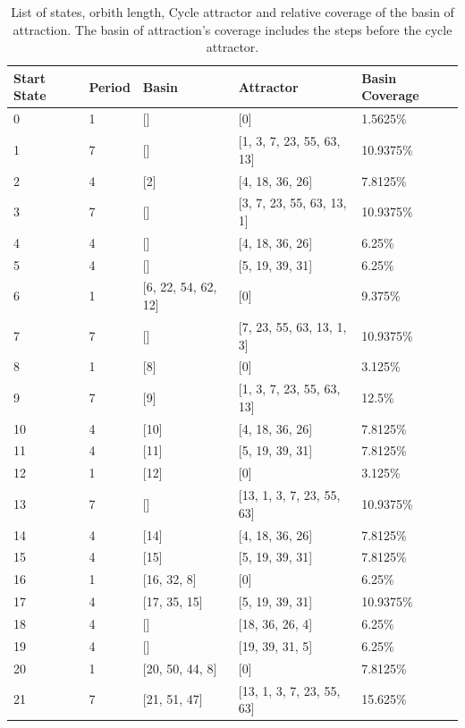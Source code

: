 \documentclass[10pt,a4paper]{article}
\begin{document}
\begin{enumerate}
\begin{table}[H]
	\centering
	\caption{List of states, orbith length, Cycle attractor and relative coverage of the basin of attraction. The basin of attraction's coverage includes the steps before the cycle attractor.}
	\label{tabelsomething}
	\begin{tabular}{|l|l|l|l|l|}
		\hline
		\textbf{Start State} & \textbf{Period} & \textbf{Basin} & \textbf{Attractor} & \textbf{Basin Coverage} \\ \hline 
		0 & 1 & [] & [0] & 1.5625\%\\ \hline 
		1 & 7 & [] & [1, 3, 7, 23, 55, 63, 13] & 10.9375\%\\ \hline 
		2 & 4 & [2] & [4, 18, 36, 26] & 7.8125\%\\ \hline 
		3 & 7 & [] & [3, 7, 23, 55, 63, 13, 1] & 10.9375\%\\ \hline 
		4 & 4 & [] & [4, 18, 36, 26] & 6.25\%\\ \hline 
		5 & 4 & [] & [5, 19, 39, 31] & 6.25\%\\ \hline 
		6 & 1 & [6, 22, 54, 62, 12] & [0] & 9.375\%\\ \hline 
		7 & 7 & [] & [7, 23, 55, 63, 13, 1, 3] & 10.9375\%\\ \hline 
		8 & 1 & [8] & [0] & 3.125\%\\ \hline 
		9 & 7 & [9] & [1, 3, 7, 23, 55, 63, 13] & 12.5\%\\ \hline 
		10 & 4 & [10] & [4, 18, 36, 26] & 7.8125\%\\ \hline 
		11 & 4 & [11] & [5, 19, 39, 31] & 7.8125\%\\ \hline 
		12 & 1 & [12] & [0] & 3.125\%\\ \hline 
		13 & 7 & [] & [13, 1, 3, 7, 23, 55, 63] & 10.9375\%\\ \hline 
		14 & 4 & [14] & [4, 18, 36, 26] & 7.8125\%\\ \hline 
		15 & 4 & [15] & [5, 19, 39, 31] & 7.8125\%\\ \hline 
		16 & 1 & [16, 32, 8] & [0] & 6.25\%\\ \hline 
		17 & 4 & [17, 35, 15] & [5, 19, 39, 31] & 10.9375\%\\ \hline 
		18 & 4 & [] & [18, 36, 26, 4] & 6.25\%\\ \hline 
		19 & 4 & [] & [19, 39, 31, 5] & 6.25\%\\ \hline 
		20 & 1 & [20, 50, 44, 8] & [0] & 7.8125\%\\ \hline 
		21 & 7 & [21, 51, 47] & [13, 1, 3, 7, 23, 55, 63] & 15.625\%\\ \hline 

\end{tabular}
\end{table}
\end{enumerate}
\end{document}
